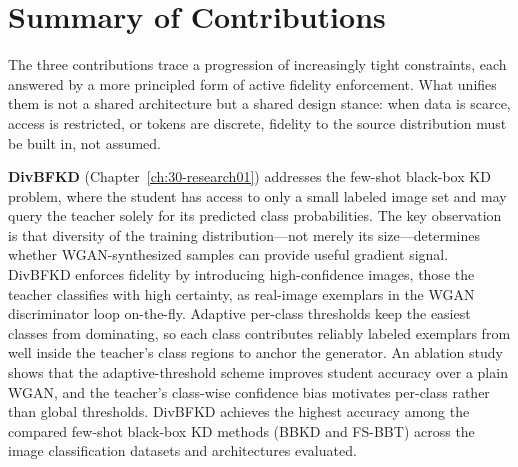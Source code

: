 \section{Summary of Contributions} \label{sec:61-conclusion-summary}

\begin{foldable}
  The three contributions trace a progression of increasingly tight constraints, each answered by a more principled form of active fidelity enforcement.
  What unifies them is not a shared architecture but a shared design stance: when data is scarce, access is restricted, or tokens are discrete, fidelity to the source distribution must be built in, not assumed.
\end{foldable}

\begin{foldable}
  \textbf{DivBFKD} (Chapter~\ref{ch:30-research01}) addresses the few-shot black-box \ac{KD} problem, where the student has access to only a small labeled image set and may query the teacher solely for its predicted class probabilities.
  The key observation is that diversity of the training distribution---not merely its size---determines whether WGAN-synthesized samples can provide useful gradient signal.
  DivBFKD enforces fidelity by introducing high-confidence images, those the teacher classifies with high certainty, as real-image exemplars in the WGAN discriminator loop on-the-fly.
  Adaptive per-class thresholds keep the easiest classes from dominating, so each class contributes reliably labeled exemplars from well inside the teacher's class regions to anchor the generator.
  An ablation study shows that the adaptive-threshold scheme improves student accuracy over a plain WGAN, and the teacher's class-wise confidence bias motivates per-class rather than global thresholds.
  DivBFKD achieves the highest accuracy among the compared few-shot black-box \ac{KD} methods (BBKD and FS-BBT) across the image classification datasets and architectures evaluated.
\end{foldable}


